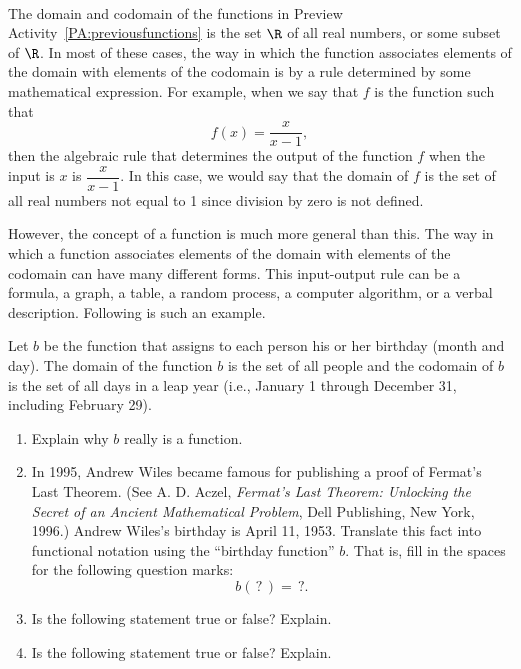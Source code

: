 \begin{previewactivity} \label{PA:birthdayfunction} \hfill \\
%
The domain and codomain of the functions in Preview Activity~\ref{PA:previousfunctions} is the set  $\R$ of all real numbers, or some subset of   $\R$.  In most of these cases, the way in which the function associates elements of the domain with elements of the codomain is by a rule determined by some mathematical expression.  For example, when we say that $f$  is the function such that
\[
f( x ) = \dfrac{x}{{x - 1}},
\]
then the algebraic rule that determines the output of the function  $f$  when the input is  $x$  is  $\dfrac{x}{{x - 1}}$.  In this case, we would say that the domain of  $f$  is the set of all real numbers not equal to  1 since division by zero is not defined.

However, the concept of a function is much more general than this.  The way in which a function associates elements of the domain with elements of the codomain can have many different forms.  This input-output rule can be a formula, a graph, a table, a random process, a computer algorithm, or a verbal description.  Following is such an example.

Let  $b$  be the function that assigns to each person his or her birthday (month and day).  The domain of the function  $b$  is the set of all people and the codomain of  $b$  is the set of all days in a leap year (i.e., January 1 through December 31, including February 29).

\begin{enumerate}
\item Explain why  $b$  really is a function.

\item In 1995, Andrew Wiles
%
 became famous for publishing a proof of Fermat's Last Theorem.  (See A. D. Aczel, \textit{Fermat's Last Theorem: Unlocking the Secret of an Ancient Mathematical Problem}, Dell Publishing, New York, 1996.)  Andrew Wiles's birthday is April 11, 1953.  Translate this fact into functional notation using the ``birthday function'' $b$.  That is, fill in the spaces for the following question marks:
\[
b( {\,?\,} ) = \,?.
\]
\item Is the following statement true or false?  Explain.


\item Is the following statement true or false?  Explain.


\end{enumerate}
\end{previewactivity}
